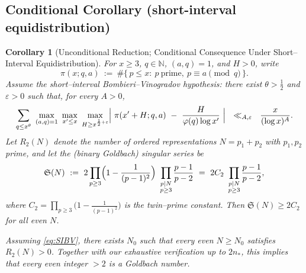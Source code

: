 \documentclass[11pt]{article}
\theoremstyle{inline}
\theoremstyle{break}
\theoremstyle{break}
\theoremstyle{break}
\theoremstyle{break}
\theoremstyle{break}
\theoremstyle{break}
\newtheorem{corollary}{Corollary}
\theoremstyle{break}
\theoremstyle{inline}
\newcommand{\nprodstar}{n_{\ast}}  %
\begin{document}
\subsection{Conditional Corollary (short-interval equidistribution)}\label{sec:SI-BV}
\begin{corollary}[Unconditional Reduction; Conditional Consequence Under Short–Interval Equidistribution]
\label{cor:SI-BV}
For \(x\ge 3\), \(q\in\mathbb{N}\), \((a,q)=1\), and \(H>0\), write
\begin{equation}\label{eq:pi-AP}
\pi(x; q,a)\ :=\ \#\{\,p\le x:\ p\ \text{prime},\ p\equiv a\!\!\pmod q\,\}.
\end{equation}
Assume the short–interval Bombieri–Vinogradov hypothesis: there exist \(\theta>\tfrac{1}{2}\) and \(\varepsilon>0\) such that, for every \(A>0\),
\begin{equation}\label{eq:SIBV}
\sum_{q\le x^{\theta}}
\ \max_{\substack{(a,q)=1}}\ \max_{x'\le x}\ \max_{H\ge x^{\frac{1}{2}+\varepsilon}}
\Bigl|\ \pi(x'+H;q,a)\ -\ \frac{H}{\varphi(q)\log x'}\ \Bigr|
\ \ \ll_{A,\varepsilon}\ \ \frac{x}{(\log x)^A}.
\end{equation}
Let \(R_2(N)\) denote the number of \emph{ordered} representations \(N=p_1+p_2\) with \(p_1,p_2\) prime, and let the (binary Goldbach) singular series be
\begin{equation}\label{eq:sing-series}
\mathfrak S(N)\ :=\ 2\prod_{p\ge 3}\Bigl(1-\frac{1}{(p-1)^2}\Bigr)\ \prod_{\substack{p\mid N\\ p\ge 3}}\frac{p-1}{p-2}
\ =\ 2C_2\ \prod_{\substack{p\mid N\\ p\ge 3}}\frac{p-1}{p-2},
\end{equation}
where \(C_2=\prod_{p\ge 3}\bigl(1-\frac{1}{(p-1)^2}\bigr)\) is the twin–prime constant. Then \(\mathfrak S(N)\ge 2C_2\) for all even \(N\).

Assuming \eqref{eq:SIBV}, there exists \(N_0\) such that every even \(N\ge N_0\) satisfies \(R_2(N)>0\). Together with our exhaustive verification up to \(2\nprodstar\), this implies that every even integer \(>2\) is a Goldbach number.
\end{corollary}
\end{document}
